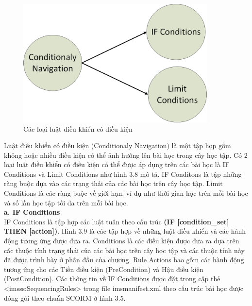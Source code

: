 		\begin{center}
	\begin{figure}[htp]
		\begin{center}
			\includegraphics[width=10cm]{Chapter3/Pictures/picture38.png}
		\end{center}
		\caption{Các loại luật điều khiển có điều kiện}
		\label{refpicture49}
	\end{figure}
\end{center}

	Luật điều khiển có điều kiện (Conditionaly Navigation) là một tập hợp gồm không hoặc nhiều điều kiện có thể ảnh hưởng lên bài học trong cây học tập. Có 2 loại luật điều khiển có điều kiện có thể được áp dụng trên các bài học là IF Conditions và Limit Conditions như hình 3.8 mô tả. IF Conditons là tập những ràng buộc dựa vào các trạng thái của các bài học trên cây học tập. Limit Conditions là các ràng buộc về giới hạn, ví dụ như thời gian học trên mỗi bài học và số lần học tập tối đa trên mỗi bài học.\\

 	\textbf{a. IF Conditions}\\
	
	IF Conditions là tập hợp các luật tuân theo cấu trúc \textbf{(IF [condition\_set] THEN [action])}. Hình 3.9 là các tập hợp về những luật điều khiển và các hành động tương ứng được đưa ra. Conditions là các điều kiện được đưa ra dựa trên các thuộc tính trạng thái của các bài học trên cây học tập và các thuộc tính này đã được trình bày ở phần đầu của chương. Rule Actions bao gồm các hành động tương ứng cho các Tiền điều kiện (PreCondition) và Hậu điều kiện (PostCondition). Các thông tin về IF Conditions được đặt trong cặp thẻ <imsss:SequencingRules> trong file imsmanifest.xml theo cấu trúc bài học được đóng gói theo chuẩn SCORM ở hình 3.5.
	
